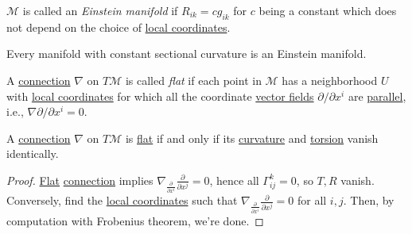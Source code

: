 \begin{definition}\label{def:Einstein-manifold}
	\(\mathcal{M} \) is called an \emph{Einstein manifold} if \(R_{ik} = c g_{ik} \) for \(c\) being a constant which does not depend on the choice of \hyperref[def:coordinate-chart]{local coordinates}.
\end{definition}

\begin{center}
\end{center}

\begin{remark}
	Every manifold with constant sectional curvature is an Einstein manifold.
\end{remark}

\begin{definition}[Flat]\label{def:connection-flat}
	A \hyperref[def:linear-connection]{connection} \(\nabla \) on \(T \mathcal{M} \) is called \emph{flat} if each point in \(\mathcal{M} \) has a neighborhood \(U\) with \hyperref[def:coordinate-chart]{local coordinates} for which all the coordinate \hyperref[def:vector-field]{vector fields} \(\partial / \partial x^i\) are \hyperref[def:parallel]{parallel}, i.e., \(\nabla \partial / \partial x^i = 0\).
\end{definition}

\begin{theorem}
	A \hyperref[def:linear-connection]{connection} \(\nabla \) on \(T \mathcal{M} \) is \hyperref[def:connection-flat]{flat} if and only if its \hyperref[def:Riemannian-curvature-tensor]{curvature} and \hyperref[def:torsion-tensor]{torsion} vanish identically.
\end{theorem}
\begin{proof}
	\hyperref[def:connection-flat]{Flat} \hyperref[def:linear-connection]{connection} implies \(\nabla _{\frac{\partial }{\partial x^i} } \frac{\partial }{\partial x^j} = 0\), hence all \(\Gamma ^k _{ij} = 0\), so \(T, R\) vanish. Conversely, find the \hyperref[def:coordinate-chart]{local coordinates} such that \(\nabla _{\frac{\partial }{\partial x^i} } \frac{\partial }{\partial x^j} = 0\) for all \(i, j\). Then, by computation with Frobenius theorem, we're done.
\end{proof}


